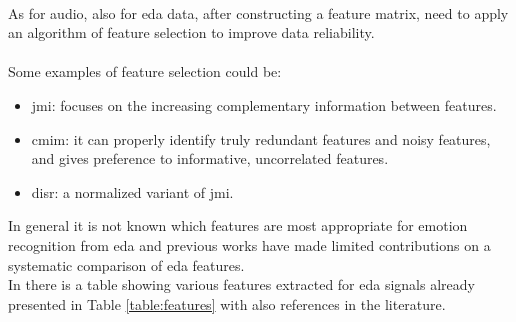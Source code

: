 \\ \indent
As for audio, also for \gls{eda} data, after constructing a feature matrix, need to apply an algorithm of feature selection to improve data reliability.
\\ \\
Some examples of feature selection could be:
\begin{itemize}
	\item \gls{jmi}: focuses on the increasing complementary information between features.
	\item \gls{cmim}: it can properly identify truly redundant features and noisy features, and gives preference to informative, uncorrelated features.
	\item \gls{disr}: a normalized variant of \gls{jmi}.
\end{itemize}
In general it is not known which features are most appropriate for emotion recognition from \gls{eda} and previous works have made limited contributions on a systematic comparison of \gls{eda} features.
\\
In \cite{shukla2019feature} there is a table showing various features extracted for \gls{eda} signals already presented in Table \ref{table:features} with also references in the literature.